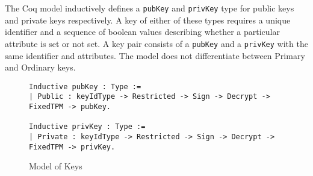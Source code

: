 The Coq model inductively defines a \verb|pubKey| and \verb|privKey| type for public keys and private keys respectively. A key of either of these types requires a unique identifier and a sequence of boolean values describing whether a particular attribute is set or not set. A key pair consists of a \verb|pubKey| and a \verb|privKey| with the same identifier and attributes. The model does not differentiate between Primary and Ordinary keys.
\begin{figure}[h]
\begin{lstlisting}[language=Coq]
Inductive pubKey : Type :=
| Public : keyIdType -> Restricted -> Sign -> Decrypt -> FixedTPM -> pubKey.

Inductive privKey : Type :=
| Private : keyIdType -> Restricted -> Sign -> Decrypt -> FixedTPM -> privKey.
\end{lstlisting}

\caption{Model of Keys}
\end{figure}



